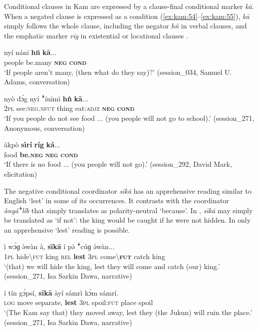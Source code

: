 \documentclass[output=paper,colorlinks,citecolor=brown]{langscibook}
\begin{document}
Conditional clauses in Kam are expressed by a clause-final conditional marker \textit{kā}. When a negated clause is expressed as a condition (\ref{ex:kam:54}--\ref{ex:kam:55}), \textit{kā} simply follows the whole clause, including the negator \textit{hǹ} in verbal clauses, and the emphatic marker \textit{rīg} in existential or locational clauses .

\ea\label{ex:kam:54} 
    \gll nyí nánī \textbf{h\={n}} \textbf{kā}...\\
        people be.many \textbf{\textsc{neg}} \textbf{\textsc{cond}} \\
    \glt ‘If people aren’t many, (then what do they say)?’ (session\_034, Samuel U. Adams, conversation)
\z 

\ea\label{ex:kam:55} 
    \gll nyò dɔ́g nyí ꜜínīmī \textbf{hǹ} \textbf{kā}...\\
        \textsc{2pl} see:\textsc{neg}.\textsc{nfut} thing eat:\textsc{adjz} \textbf{\textsc{neg}} \textbf{\textsc{cond}} \\
    \glt ‘If you people do not see food ... (you people will not go to school).’ (session\_271, Anonymous, conversation)
\z 

\ea\label{ex:kam:56} 
    \gll àkpò \textbf{sìrí} \textbf{ríg} \textbf{ká}...\\
        food \textbf{be.\textsc{neg}} \textbf{\textsc{neg}} \textbf{\textsc{cond}} \\
    \glt ‘If there is no food ... (you people will not go).’ (session\_292, David Mark, elicitation)
\z 

The negative conditional coordinator \textit{sīkā} has an apprehensive reading similar to English ‘lest’ in some of its occurrences. It contrasts with the coordinator \textit{ànyáꜜlíb} that simply translates as polarity-neutral ‘because’. In , \textit{sīkā} may simply be translated as ‘if not’: the king would be caught if he were not hidden. In  only an apprehensive ‘lest’ reading is possible. 

\ea\label{ex:kam:57} 
    \gll ì wɔ́ɡ ə̀wàn à, \textbf{sīkā} í pə́ ꜜcúɡ ə́wàn...\\
        \textsc{1pl} hide{\textbackslash}\textsc{fut} king \textsc{rel} \textbf{lest} \textsc{3pl} come{\textbackslash}\textbf{\textsc{fut}} catch king \\
    \glt ‘(that) we will hide the king, lest they will come and catch (our) king.’ (session\_271, Isa Sarkin Dawa, narrative)
\z 

\ea\label{ex:kam:58} 
    \gll í tín gɔ́psí, \textbf{sīkā} àyí sámrì kɔ̀m sámrí.\\
        \textsc{log} move separate, \textbf{lest} \textsc{3pl} spoil:\textsc{fut} place spoil\\
    \glt ‘(The Kam say that) they moved away, lest they (the Jukun) will ruin the place.’ (session\_271, Isa Sarkin Dawa, narrative)
\z 
\end{document}
